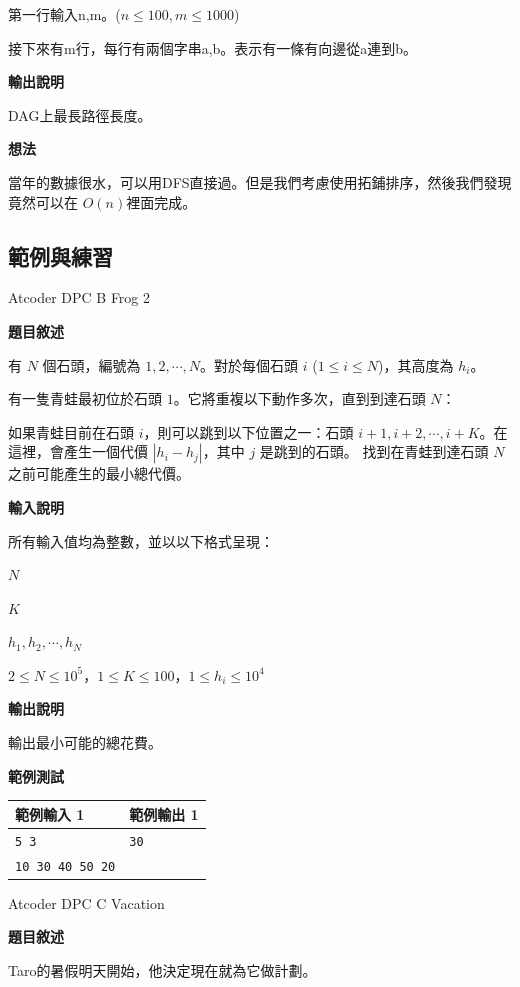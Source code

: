     第一行輸入n,m。($n \le 100, m \le 1000$)

    接下來有m行，每行有兩個字串a,b。表示有一條有向邊從a連到b。

    \textbf{輸出說明}

    DAG上最長路徑長度。

    \textbf{想法}

    當年的數據很水，可以用DFS直接過。但是我們考慮使用拓鋪排序，然後我們發現竟然可以在
    $O(n)$裡面完成。

    \subsection{範例與練習}

    \problem Atcoder DPC B Frog 2

    \textbf{題目敘述}

    有 $N$ 個石頭，編號為 $1,2,\cdots,N$。對於每個石頭 $i$ ($1\leq i\leq N$)，其高度為 $h_i$。

    有一隻青蛙最初位於石頭 $1$。它將重複以下動作多次，直到到達石頭 $N$：

    如果青蛙目前在石頭 $i$，則可以跳到以下位置之一：石頭 $i+1,i+2,\cdots,i+K$。在這裡，會產生一個代價 $|h_i - h_j|$，其中 $j$ 是跳到的石頭。
    找到在青蛙到達石頭 $N$ 之前可能產生的最小總代價。

    \textbf{輸入說明}

    所有輸入值均為整數，並以以下格式呈現：

    $N$

    $K$

    $h_1,h_2,\cdots,h_N$

    $2\leq N\leq 10^5$，$1\leq K\leq 100$，$1\leq h_i\leq 10^4$

    \textbf{輸出說明}

    輸出最小可能的總花費。

    \textbf{範例測試}

    \begin{tabular}{|m{7cm}|m{7cm}|}
        \hline
        範例輸入 1 & 範例輸出 1 \\
        \hline
        \verb|5 3| & \verb|30| \\
        \verb|10 30 40 50 20| & \\
        \hline
    \end{tabular}

    \problem Atcoder DPC C Vacation

    \textbf{題目敘述}

    Taro的暑假明天開始，他決定現在就為它做計劃。

